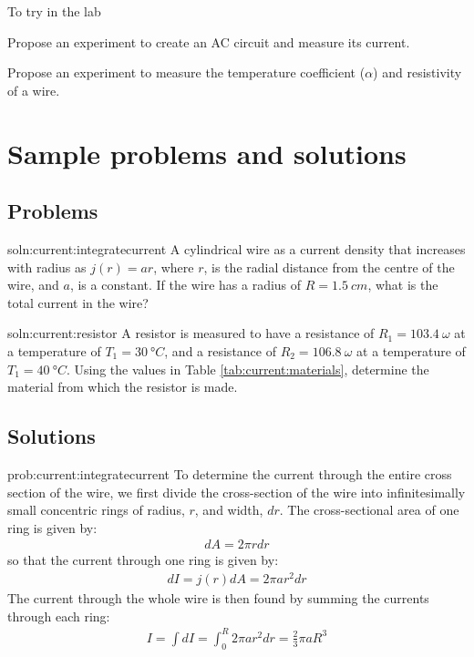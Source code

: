\begin{chapteractivity}{To try in the lab}
{ 
\item Propose an experiment to create an AC circuit and measure its current.
\item Propose an experiment to measure the temperature coefficient ($\alpha$) and resistivity of a wire.
}
\end{chapteractivity}

\newpage
\section{Sample problems and solutions}



\subsection{Problems}
\begin{problem}{soln:current:integratecurrent}{\label{prob:current:integratecurrent}}
A cylindrical wire as a current density that increases with radius as $j(r) = ar$, where $r$, is the radial distance from the centre of the wire, and $a$, is a constant. If the wire has a radius of $R = \SI{1.5}{cm}$, what is the total current in the wire?
\end{problem}


\begin{problem}{soln:current:resistor}{\label{prob:current:resistor} A resistor is measured to have a resistance of $R_1=\SI{103.4}{\omega}$ at a temperature of $T_1=\SI{30}{\degree C}$, and a resistance of $R_2=\SI{106.8}{\omega}$ at a temperature of $T_1=\SI{40}{\degree C}$. Using the values in Table \ref{tab:current:materials}, determine the material from which the resistor is made.
}
\end{problem}


\newpage
\subsection{Solutions}
\begin{solution}{prob:current:integratecurrent}\label{soln:current:integratecurrent}
To determine the current through the entire cross section of the wire, we first divide the cross-section of the wire into infinitesimally small concentric rings of radius, $r$, and width, $dr$. The cross-sectional area of one ring is given by:
\begin{align*}
dA = 2\pi r dr
\end{align*}
so that the current through one ring is given by:
\begin{align*}
dI = j(r) dA = 2\pi a r^2 dr
\end{align*}
The current through the whole wire is then found by summing the currents through each ring:
\begin{align*}
I=\int dI = \int_0^R 2\pi a r^2 dr=\frac{2}{3}\pi aR^3
\end{align*}
\end{solution}

